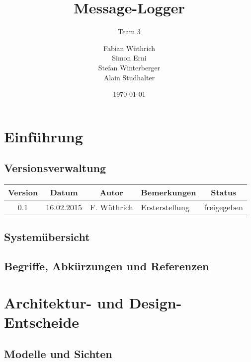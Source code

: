 \documentclass[11pt,a4paper]{scrreprt}
\begin{document}
\titlehead{Hochschule Luzern \\ 
	Technik \& Architektur}
\subject{Systemspezifikation}
\title{Message-Logger}
\subtitle{Team 3}
\author{Fabian Wüthrich \\ 
	Simon Erni \\ 
	Stefan Winterberger \\ 
	Alain Studhalter}
\date{\today}
\publishers{Verteilte Systeme \& Komponenten}

\maketitle

\tableofcontents

\chapter{Einführung}

\section{Versionsverwaltung}

\begin{table}[h!]
	\renewcommand{\arraystretch}{1.5}
	\begin{tabular}{|c|c|c|p{7cm}|c|}
		\hline
		Version & Datum & Autor & Bemerkungen & Status \\ \hline
		0.1 & 16.02.2015 & F. Wüthrich & Ersterstellung & freigegeben \\ \hline
	\end{tabular}
\end{table}

\section{Systemübersicht}

\section{Begriffe, Abkürzungen und Referenzen }

\chapter{Architektur- und Design-Entscheide}

\section{Modelle und Sichten}
\end{document}
